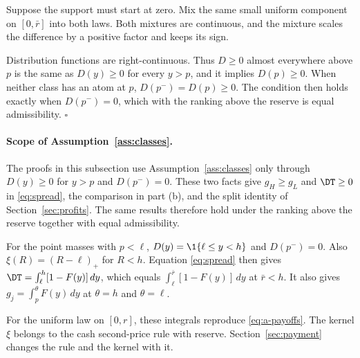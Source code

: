 Suppose the support must start at zero. Mix the same small uniform component on \([0,\bar r]\) into both laws.
Both mixtures are continuous, and the mixture scales the difference by a positive factor and keeps its sign.

Distribution functions are right-continuous. Thus \(D\ge0\) almost everywhere above \(p\) is the same as
\(D(y)\ge0\) for every \(y>p\), and it implies \(D(p)\ge0\). When neither class has an atom at \(p\),
\(D(p^-)=D(p)\ge0\). The condition then holds exactly when \(D(p^-)=0\), which with the ranking above the
reserve is equal admissibility. \(\square\)

\paragraph{Scope of Assumption~\ref{ass:classes}.}
The proofs in this subsection use Assumption~\ref{ass:classes} only through \(D(y)\ge0\) for \(y>p\) and
\(D(p^-)=0\). These two facts give \(g_H\ge g_L\) and \(\DT\ge0\) in \eqref{eq:spread}, the comparison in part
(b), and the split identity of Section~\ref{sec:profits}. The same results therefore hold under the ranking
above the reserve together with equal admissibility.

For the point masses with \(p<\ell\), \(D(y)=\1\{\ell\le y<h\}\) and \(D(p^-)=0\). Also \(\xi(R)=(R-\ell)_+\)
for \(R<h\). Equation \eqref{eq:spread} then gives \(\DT=\int_\ell^h[1-F(y)]\,dy\), which equals
\(\int_\ell^{\bar r}[1-F(y)]\,dy\) at \(\bar r<h\). It also gives \(g_j=\int_p^\theta F(y)\,dy\) at \(\theta=h\)
and \(\theta=\ell\).

For the uniform law on \([0,r]\), these integrals reproduce \eqref{eq:a-payoffs}. The kernel \(\xi\) belongs to
the cash second-price rule with reserve. Section~\ref{sec:payment} changes the rule and the kernel with it.
